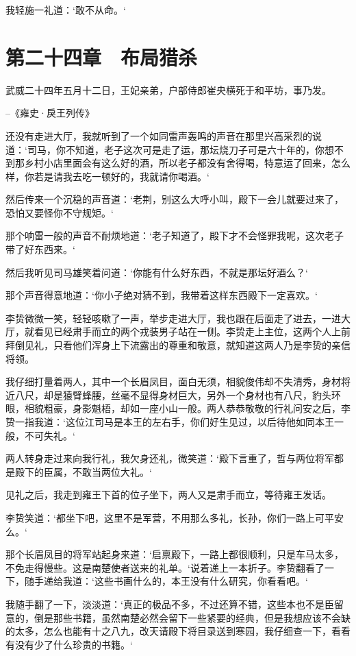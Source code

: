 我轻施一礼道：‘敢不从命。‘

\chapter{第二十四章　布局猎杀}

武威二十四年五月十二日，王妃亲弟，户部侍郎崔央横死于和平坊，事乃发。

--《雍史·戾王列传》

还没有走进大厅，我就听到了一个如同雷声轰鸣的声音在那里兴高采烈的说道：‘司马，你不知道，老子这次可是走了运，那坛烧刀子可是六十年的，你想不到那乡村小店里面会有这么好的酒，所以老子都没有舍得喝，特意运了回来，怎么样，你若是请我去吃一顿好的，我就请你喝酒。‘

然后传来一个沉稳的声音道：‘老荆，别这么大呼小叫，殿下一会儿就要过来了，恐怕又要怪你不守规矩。‘

那个响雷一般的声音不耐烦地道：‘老子知道了，殿下才不会怪罪我呢，这次老子带了好东西来。‘

然后我听见司马雄笑着问道：‘你能有什么好东西，不就是那坛好酒么？‘

那个声音得意地道：‘你小子绝对猜不到，我带着这样东西殿下一定喜欢。‘

李贽微微一笑，轻轻咳嗽了一声，举步走进大厅，我也跟在后面走了进去，一进大厅，就看见已经肃手而立的两个戎装男子站在一侧。李贽走上主位，这两个人上前拜倒见礼，只看他们浑身上下流露出的尊重和敬意，就知道这两人乃是李贽的亲信将领。

我仔细打量着两人，其中一个长眉凤目，面白无须，相貌俊伟却不失清秀，身材将近八尺，却是猿臂蜂腰，丝毫不显得身材巨大，另外一个身材也有八尺，豹头环眼，相貌粗豪，身影魁梧，却如一座小山一般。两人恭恭敬敬的行礼问安之后，李贽一指我道：‘这位江司马是本王的左右手，你们好生见过，以后待他如同本王一般，不可失礼。‘

两人转身走过来向我行礼，我欠身还礼，微笑道：‘殿下言重了，哲与两位将军都是殿下的臣属，不敢当两位大礼。‘

见礼之后，我走到雍王下首的位子坐下，两人又是肃手而立，等待雍王发话。

李贽笑道：‘都坐下吧，这里不是军营，不用那么多礼，长孙，你们一路上可平安么。‘

那个长眉凤目的将军站起身来道：‘启禀殿下，一路上都很顺利，只是车马太多，不免走得慢些。这是南楚使者送来的礼单。‘说着递上一本折子。李贽翻看了一下，随手递给我道：‘这些书画什么的，本王没有什么研究，你看看吧。‘

我随手翻了一下，淡淡道：‘真正的极品不多，不过还算不错，这些本也不是臣留意的，倒是那些书籍，虽然南楚必然会留下一些紧要的经典，但是我想应该不会缺的太多，怎么也能有十之八九，改天请殿下将目录送到寒园，我仔细查一下，看看有没有少了什么珍贵的书籍。‘

